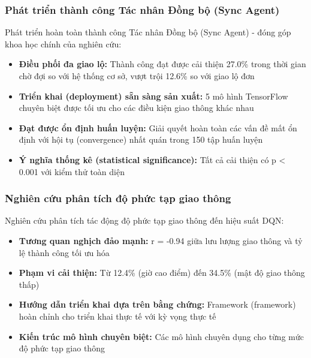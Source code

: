 \subsubsection{Phát triển thành công Tác nhân Đồng bộ (Sync Agent)}
Phát triển hoàn toàn thành công Tác nhân Đồng bộ (Sync Agent) - đóng góp khoa học chính của nghiên cứu:
\begin{itemize}
    \item \textbf{Điều phối đa giao lộ:} Thành công đạt được cải thiện 27.0\%
        trong thời gian chờ đợi so với hệ thống cơ sở, vượt trội 12.6\% so với giao lộ đơn

    \item \textbf{Triển khai (deployment) sẵn sàng sản xuất:} 5 mô hình TensorFlow chuyên biệt 
        được tối ưu cho các điều kiện giao thông khác nhau

    \item \textbf{Đạt được ổn định huấn luyện:} Giải quyết hoàn toàn các vấn đề mất ổn định
        với hội tụ (convergence) nhất quán trong 150 tập huấn luyện

    \item \textbf{Ý nghĩa thống kê (statistical significance):} Tất cả cải thiện có p < 0.001 với
        kiểm thử toàn diện
\end{itemize}

\subsubsection{Nghiên cứu phân tích độ phức tạp giao thông}
Nghiên cứu phân tích tác động độ phức tạp giao thông đến hiệu suất DQN:
\begin{itemize}
    \item \textbf{Tương quan nghịch đảo mạnh:} r = -0.94 giữa lưu lượng giao thông và
        tỷ lệ thành công tối ưu hóa

    \item \textbf{Phạm vi cải thiện:} Từ 12.4\% (giờ cao điểm) đến 34.5\% (mật độ giao thông thấp)

    \item \textbf{Hướng dẫn triển khai dựa trên bằng chứng:} Framework (framework) hoàn chỉnh cho
        triển khai thực tế với kỳ vọng thực tế

    \item \textbf{Kiến trúc mô hình chuyên biệt:} Các mô hình chuyên dụng cho từng
        mức độ phức tạp giao thông
\end{itemize}

